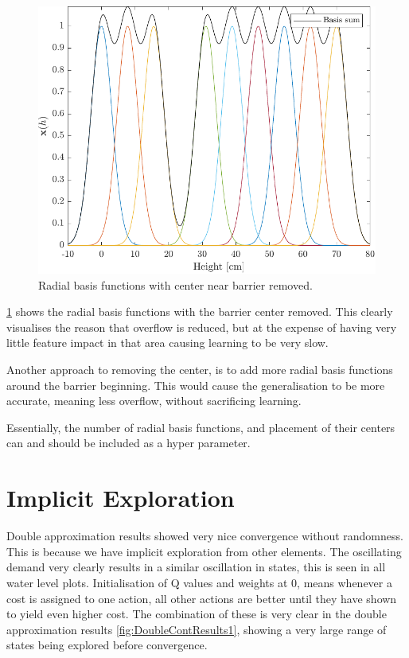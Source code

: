 \begin{figure}[h!]
	\centering
	\includegraphics[width=0.7\linewidth]{figures/RemovedRBF.pdf}
	\caption{Radial basis functions with center near barrier removed.}
	\label{fig:RemovedRBF}
\end{figure}

\cref{fig:RemovedRBF} shows the radial basis functions with the barrier center removed. This clearly visualises the reason that overflow is reduced, but at the expense of having very little feature impact in that area causing learning to be very slow.

Another approach to removing the center, is to add more radial basis functions around the barrier beginning. This would cause the generalisation to be more accurate, meaning less overflow, without sacrificing learning.

Essentially, the number of radial basis functions, and placement of their centers can and should be included as a hyper parameter.


\section{Implicit Exploration}
Double approximation results showed very nice convergence without randomness. This is because we have implicit exploration from other elements. The oscillating demand very clearly results in a similar oscillation in states, this is seen in all water level plots. Initialisation of Q values and weights at 0, means whenever a cost is assigned to one action, all other actions are better until they have shown to yield even higher cost. The combination of these is very clear in the double approximation results \cref{fig:DoubleContResults1}, showing a very large range of states being explored before convergence.


